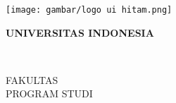 \begin{titlepage}
    \begin{center}
        \texttt{[image: gambar/logo ui hitam.png]}
        
        \bfseries
        UNIVERSITAS INDONESIA

        \vspace{1cm}
        \large 
        \MakeUppercase{\judul}

        \vfill
        
        \MakeUppercase{\jenis}

        \vspace{4cm}
        \normalsize
        \MakeUppercase{\nama}\\
        \npm

        \vfill
        FAKULTAS \MakeUppercase{\fakultas}\\
        PROGRAM STUDI \MakeUppercase{\prodi}\\
        \MakeUppercase{\tempat}\\
        \MakeUppercase{\bulan} \tahun
    \end{center}
    \normalfont
\end{titlepage}